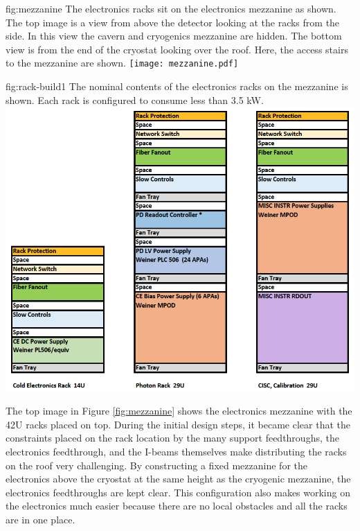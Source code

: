 \begin{dunefigure}{fig:mezzanine}
  {The electronics racks sit on the  electronics mezzanine as shown. The top image is a view from above the detector looking at the racks from the side. In this view the cavern and cryogenics mezzanine are hidden. The bottom view is from the end of the cryostat looking over the roof. Here, the access stairs to the mezzanine are shown.}
 \texttt{[image: mezzanine.pdf]}
\end{dunefigure}

\begin{dunefigure}{fig:rack-build1}
  {The nominal contents of the electronics racks on the mezzanine is shown. Each rack is configured to consume less than 3.5 \si{kW}. }
 \includegraphics[width=.8\textwidth]{graphics/rack-build1.png} %
\end{dunefigure}

The top image in Figure \ref{fig:mezzanine} shows the  electronics mezzanine with the 42U racks placed on top. 
During the initial design steps, it became clear that the constraints placed on the rack location by the many  support feedthroughs, the electronics feedthrough, and the I-beams themselves make distributing the racks on the roof very challenging. 
By constructing a fixed mezzanine for the electronics 
above the cryostat at the same height as the cryogenic mezzanine, the electronics feedthroughs are kept clear. 
This configuration also makes working on the electronics much easier because there are no local obstacles and all the racks are in one place.

